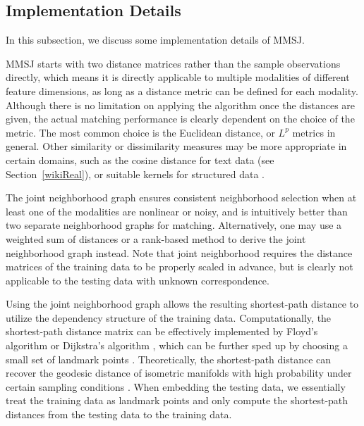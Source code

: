 \documentclass[times,twocolumn,final]{elsarticle}
\begin{document}
\subsection{Implementation Details}
\label{discuss}
In this subsection, we discuss some implementation details of MMSJ.

MMSJ starts with two distance matrices rather than the sample observations directly, which means it is directly applicable to multiple modalities of different feature dimensions, as long as a distance metric can be defined for each modality. Although there is no limitation on applying the algorithm once the distances are given, the actual matching performance is clearly dependent on the choice of the metric. The most common choice is the Euclidean distance, or $L^{p}$ metrics in general. Other similarity or dissimilarity measures may be more appropriate in certain domains, such as the cosine distance for text data (see Section~\ref{wikiReal}), or suitable kernels for structured data \citep{HofmannEtAl2008}. 

The joint neighborhood graph ensures consistent neighborhood selection when at least one of the modalities are nonlinear or noisy, and is intuitively better than two separate neighborhood graphs for matching. Alternatively, one may use a weighted sum of distances or a rank-based method to derive the joint neighborhood graph instead. Note that joint neighborhood requires the distance matrices of the training data to be properly scaled in advance, but is clearly not applicable to the testing data with unknown correspondence.

Using the joint neighborhood graph allows the resulting shortest-path distance to utilize the dependency structure of the training data. Computationally, the shortest-path distance matrix can be effectively implemented by Floyd's algorithm or Dijkstra's algorithm \citep{TenenbaumSilvaLangford2000}, which can be further sped up by choosing a small set of landmark points \citep{SilvaTenenbaum2003, BengioEtal2003}. Theoretically, the shortest-path distance can recover the geodesic distance of isometric manifolds with high probability under certain sampling conditions \citep{BernsteinEtAl2000, SilvaTenenbaum2003}. When embedding the testing data, we essentially treat the training data as landmark points and only compute the shortest-path distances from the testing data to the training data.
\end{document}
